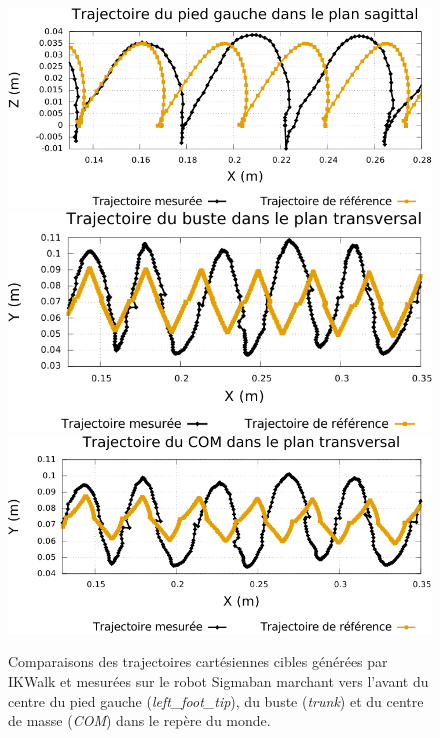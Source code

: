 \begin{figure}[htbp]
    \begin{center}
        \includegraphics[type=pdf,ext=.pdf,read=.pdf,width=0.9\linewidth]{../plot/walk_traj_foot}
        \includegraphics[type=pdf,ext=.pdf,read=.pdf,width=0.9\linewidth]{../plot/walk_traj_trunk}
        \includegraphics[type=pdf,ext=.pdf,read=.pdf,width=0.9\linewidth]{../plot/walk_traj_com}
        \caption{\label{fig:walk_trajs} 
            Comparaisons des trajectoires cartésiennes cibles générées par IKWalk 
            et mesurées sur le robot Sigmaban marchant vers l'avant
            du centre du pied gauche (\textit{left\_foot\_tip}), 
            du buste (\textit{trunk}) et 
            du centre de masse (\textit{COM}) dans le repère du monde.}
    \end{center}
\end{figure}

